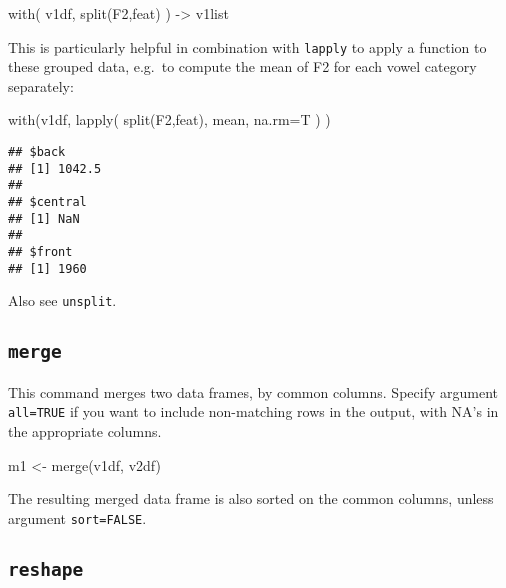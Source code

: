 \documentclass[
]{book}
\newenvironment{Shaded}{\begin{snugshade}}{\end{snugshade}}
\newcommand{\AttributeTok}[1]{\textcolor[rgb]{0.77,0.63,0.00}{#1}}
\newcommand{\FunctionTok}[1]{\textcolor[rgb]{0.00,0.00,0.00}{#1}}
\newcommand{\NormalTok}[1]{#1}
\newcommand{\OtherTok}[1]{\textcolor[rgb]{0.56,0.35,0.01}{#1}}
\begin{document}
\begin{Shaded}
\begin{Highlighting}[]
\FunctionTok{with}\NormalTok{( v1df, }\FunctionTok{split}\NormalTok{(F2,feat) ) }\OtherTok{{-}\textgreater{}}\NormalTok{ v1list }
\end{Highlighting}
\end{Shaded}

This is particularly helpful in combination with
\texttt{lapply} to apply a function to these grouped
data, e.g.~to compute the mean of F2 for each vowel category
separately:

\begin{Shaded}
\begin{Highlighting}[]
\FunctionTok{with}\NormalTok{(v1df, }\FunctionTok{lapply}\NormalTok{( }\FunctionTok{split}\NormalTok{(F2,feat), mean, }\AttributeTok{na.rm=}\NormalTok{T ) ) }
\end{Highlighting}
\end{Shaded}

\begin{verbatim}
## $back
## [1] 1042.5
## 
## $central
## [1] NaN
## 
## $front
## [1] 1960
\end{verbatim}

Also see \texttt{unsplit}.

\hypertarget{merge}{%
\subsection{\texorpdfstring{\texttt{merge}}{merge}}\label{merge}}

This command merges two data frames, by common columns. Specify
argument \texttt{all=TRUE} if you want to include non-matching rows in the
output, with NA's in the appropriate columns.

\begin{Shaded}
\begin{Highlighting}[]
\NormalTok{m1 }\OtherTok{\textless{}{-}} \FunctionTok{merge}\NormalTok{(v1df, v2df)}
\end{Highlighting}
\end{Shaded}

The resulting merged data frame is also sorted on the common
columns, unless argument \texttt{sort=FALSE}.

\hypertarget{reshape}{%
\subsection{\texorpdfstring{\texttt{reshape}}{reshape}}\label{reshape}}
\end{document}

